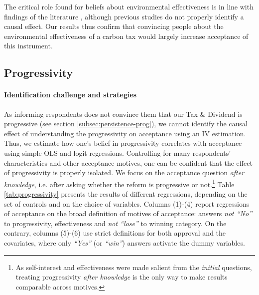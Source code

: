\documentclass[11pt]{article}
\begin{document}

The critical role found for beliefs about environmental effectiveness is in line with findings of the literature \citep{saelen_choice_2011,kallbekken_saelen_2011,baranzini_effectiveness_2017}, although previous studies do not properly identify a causal effect. Our results thus confirm that convincing people about the environmental effectiveness of a carbon tax would largely increase acceptance of this instrument.

    \subsection{Progressivity}

\paragraph{Identification challenge and strategies}

As informing respondents does not convince them that our Tax \& Dividend is progressive (see section \ref{subsec:persistence-prog}), we cannot identify the causal effect of understanding the progressivity on acceptance using an IV estimation. Thus, we estimate how one's belief in progressivity correlates with acceptance using simple OLS and logit regressions. Controlling for many respondents' characteristics and other acceptance motives, one can be confident that the effect of progressivity is properly isolated. We focus on the acceptance question \textit{after knowledge}, i.e. after asking whether the reform is progressive or not.\footnote{As self-interest and effectiveness were made salient from the \textit{initial} questions, treating progressivity \textit{after knowledge} is the only way to make results comparable across motives.} Table \ref{tab:progressivity} presents the results of different regressions, depending on the set of controls and on the choice of variables. Columns (1)-(4) report regressions of acceptance on the broad definition of motives of acceptance: answers \textit{not ``No''} to progressivity, effectiveness and \textit{not ``lose''} to winning category. On the contrary, columns (5)-(6) use strict definitions for both approval and the covariates, where only \textit{``Yes''} (or \textit{``win''}) answers activate the dummy variables. 
\end{document}
